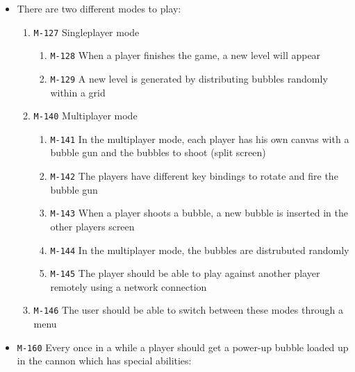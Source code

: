 \documentclass[a4paper]{article}
\begin{document}
\begin{itemize}
  \item There are two different modes to play:
  \begin{enumerate}
  
      \item \texttt{M-127} Singleplayer mode
      \begin{enumerate}
          \item \texttt{M-128} When a player finishes the game, a new level will appear
          \item \texttt{M-129} A new level is generated by distributing bubbles randomly within a grid
      \end{enumerate}


      \item \texttt{M-140} Multiplayer mode
      \begin{enumerate}
          \item \texttt{M-141} In the multiplayer mode, each player has his own canvas with a bubble gun and the bubbles to shoot (split screen)
          \item \texttt{M-142} The players have different key bindings to rotate and fire the bubble gun
          \item \texttt{M-143} When a player shoots a bubble, a new bubble is inserted in the other players screen
          \item \texttt{M-144} In the multiplayer mode, the bubbles are distrubuted randomly
          \item \texttt{M-145} The player should be able to play against another player remotely using a network connection
      \end{enumerate}
      
      \item \texttt{M-146} The user should be able to switch between these modes through a menu
  \end{enumerate}
  
  
  \item \texttt{M-160} Every once in a while a player should get a power-up bubble loaded up in the cannon which has special abilities:
  

\end{itemize}
\end{document}
